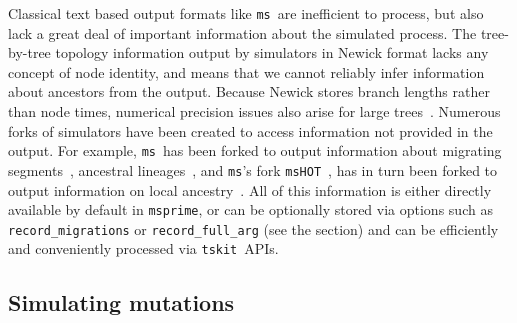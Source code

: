 \documentclass{article}
\newcommand{\msprime}[0]{\texttt{msprime}}
\newcommand{\tskit}[0]{\texttt{tskit}}
\newcommand{\ms}[0]{\texttt{ms}}
\newcommand{\msHOT}[0]{\texttt{msHOT}}
\begin{document}
Classical text based output formats like \ms\ are inefficient to process,
but also lack a great deal of important information about the simulated
process.
The tree-by-tree topology information output by simulators in Newick
format lacks any concept of node identity,
and means that we cannot reliably infer information about ancestors
from the output. Because Newick stores branch lengths rather
than node times, numerical precision issues also arise for
large trees~\citep{mcgill2013graphml}.
Numerous forks  of simulators have been created to access information not provided
in the output. For example, \ms\  has been forked to
output information about migrating segments~\citep{rosenzweig2016powerful},
ancestral lineages~\citep{chen2013asymptotic},
and \ms's fork \msHOT~\citep{hellenthal2007mshot},
has in turn been forked to output information on local
ancestry~\citep{racimo2017archaic}.
All of this information
is either directly available by default in \msprime, or can be optionally
stored via options such as \texttt{record\_migrations} or
\texttt{record\_full\_arg} (see the  section) and
can be efficiently and conveniently processed via \tskit\ APIs.


\subsection*{Simulating mutations}
\label{sec-mutations}
\end{document}
